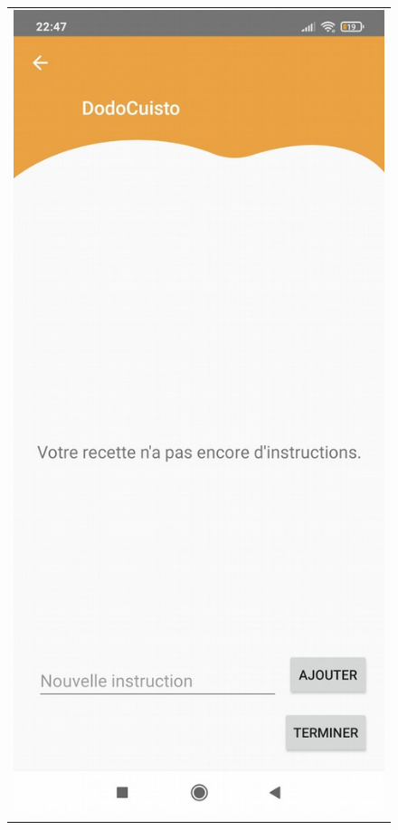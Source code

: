 \documentclass{article}
\begin{document}
\begin{figure}
\begin{tabular}{@{}c@{}}
        \includegraphics[scale=0.2]{instruction.png}
    \end{tabular}
\end{figure}
\end{document}
